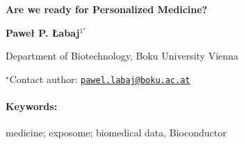 \documentclass[11pt, a4paper]{article}
\renewcommand{\title}[1]{\begin{center}{\bf \LARGE #1}\end{center}}
\newcommand{\keywords}{\paragraph{Keywords:}}
\begin{document}
\pagestyle{empty}

\title{Are we ready for Personalized Medicine?}

\begin{center}
  {\bf Paweł P. Łabaj$^{1^\star}$}
\end{center}

\vskip 0.3cm

\begin{affiliations}
\begin{enumerate}
\begin{minipage}{0.915\textwidth}
\centering
\item Department of Biotechnology, Boku University Vienna \\[-2pt]
\end{minipage}
\end{enumerate}
$^\star$Contact author: \href{mailto:pawel.labaj@boku.ac.at}{\nolinkurl{pawel.labaj@boku.ac.at}}\\
\end{affiliations}

\vskip 0.5cm

\begin{minipage}{0.915\textwidth}
\keywords medicine; exposome; biomedical data, Bioconductor
\end{minipage}

\vskip 0.8cm
\end{document}
